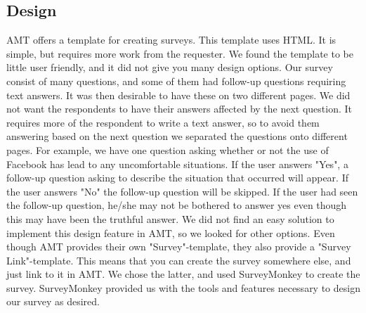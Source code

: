 \subsection{Design}
AMT offers a template for creating surveys. This template uses HTML. It is simple, but requires more work from the requester. We found the template to be little user friendly, and it did not give you many design options. Our survey consist of many questions, and some of them had follow-up questions requiring text answers. It was then desirable to have these on two different pages. We did not want the respondents to have their answers affected by the next question. It requires more of the respondent to write a text answer, so to avoid them answering based on the next question we separated the questions onto different pages. For example, we have one question asking whether or not the use of Facebook has lead to any uncomfortable situations. If the user answers "Yes", a follow-up question asking to describe the situation that occurred will appear. If the user answers "No" the follow-up question will be skipped. If the user had seen the follow-up question, he/she may not be bothered to answer yes even though this may have been the truthful answer. We did not find an easy solution to implement this design feature in AMT, so we looked for other options. Even though AMT provides their own "Survey"-template, they also provide a "Survey Link"-template. This means that you can create the survey somewhere else, and just link to it in AMT. We chose the latter, and used SurveyMonkey to create the survey. SurveyMonkey provided us with the tools and features necessary to design our survey as desired. 


